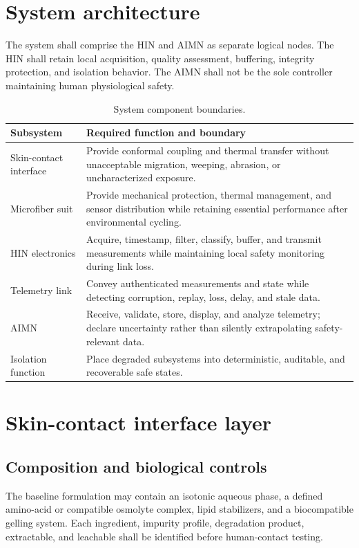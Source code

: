 \documentclass[11pt,a4paper]{article}
\begin{document}
\section{System architecture}\label{sec:architecture}
The system shall comprise the HIN and AIMN as separate logical nodes. The HIN shall retain local acquisition, quality assessment, buffering, integrity protection, and isolation behavior. The AIMN shall not be the sole controller maintaining human physiological safety.

\begin{table}[H]
\centering
\caption{System component boundaries.}
\label{tab:architecture}
\begin{tabularx}{\textwidth}{p{}X}
\toprule
\textbf{Subsystem} & \textbf{Required function and boundary}\\
\midrule
Skin-contact interface & Provide conformal coupling and thermal transfer without unacceptable migration, weeping, abrasion, or uncharacterized exposure.\\
Microfiber suit & Provide mechanical protection, thermal management, and sensor distribution while retaining essential performance after environmental cycling.\\
HIN electronics & Acquire, timestamp, filter, classify, buffer, and transmit measurements while maintaining local safety monitoring during link loss.\\
Telemetry link & Convey authenticated measurements and state while detecting corruption, replay, loss, delay, and stale data.\\
AIMN & Receive, validate, store, display, and analyze telemetry; declare uncertainty rather than silently extrapolating safety-relevant data.\\
Isolation function & Place degraded subsystems into deterministic, auditable, and recoverable safe states.\\
\bottomrule
\end{tabularx}
\end{table}

\section{Skin-contact interface layer}\label{sec:interface}
\subsection{Composition and biological controls}
The baseline formulation may contain an isotonic aqueous phase, a defined amino-acid or compatible osmolyte complex, lipid stabilizers, and a biocompatible gelling system. Each ingredient, impurity profile, degradation product, extractable, and leachable shall be identified before human-contact testing.
\end{document}

